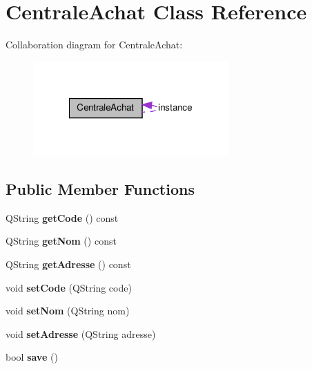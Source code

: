 \hypertarget{class_centrale_achat}{
\section{CentraleAchat Class Reference}
\label{d3/d04/class_centrale_achat}
}


Collaboration diagram for CentraleAchat:\nopagebreak
\begin{figure}[H]
\begin{center}
\leavevmode
\includegraphics[width=213pt]{d6/dac/class_centrale_achat__coll__graph}
\end{center}
\end{figure}
\subsection*{Public Member Functions}
\begin{DoxyCompactItemize}
\item 
\hypertarget{class_centrale_achat_a602e6d4322283e60f86025d914cca6cf}{
QString {\bfseries getCode} () const }
\label{d3/d04/class_centrale_achat_a602e6d4322283e60f86025d914cca6cf}

\item 
\hypertarget{class_centrale_achat_a295209796a31cba5282e74016c5aac73}{
QString {\bfseries getNom} () const }
\label{d3/d04/class_centrale_achat_a295209796a31cba5282e74016c5aac73}

\item 
\hypertarget{class_centrale_achat_a8ca22e3e7442a4b745645b088ec57a29}{
QString {\bfseries getAdresse} () const }
\label{d3/d04/class_centrale_achat_a8ca22e3e7442a4b745645b088ec57a29}

\item 
\hypertarget{class_centrale_achat_ab810a1b8190a13cc97680526ef4e25dc}{
void {\bfseries setCode} (QString code)}
\label{d3/d04/class_centrale_achat_ab810a1b8190a13cc97680526ef4e25dc}

\item 
\hypertarget{class_centrale_achat_adcd903cff04ad07ef524c5b1744149fb}{
void {\bfseries setNom} (QString nom)}
\label{d3/d04/class_centrale_achat_adcd903cff04ad07ef524c5b1744149fb}

\item 
\hypertarget{class_centrale_achat_a67921d14e0704ee0574ab8f6c8d5b1ba}{
void {\bfseries setAdresse} (QString adresse)}
\label{d3/d04/class_centrale_achat_a67921d14e0704ee0574ab8f6c8d5b1ba}

\item 
\hypertarget{class_centrale_achat_a6bc25defd3ed9d0502e48bbb99823b87}{
bool {\bfseries save} ()}
\label{d3/d04/class_centrale_achat_a6bc25defd3ed9d0502e48bbb99823b87}

\end{DoxyCompactItemize}
